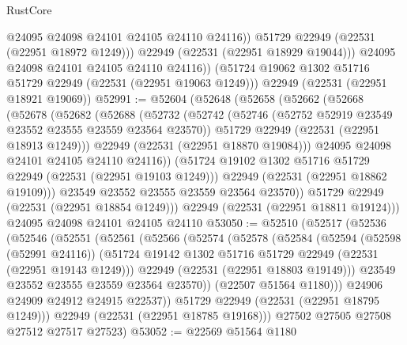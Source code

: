 \begin{lexlean}{RustCore}
\begin{coremodule}
                @24095
                @24098
                @24101
                @24105
                @24110
                @24116))
            @51729
            @22949
            (@22531 (@22951 @18972 @1249)))
          @22949
          (@22531 (@22951 @18929 @19044)))
        @24095
        @24098
        @24101
        @24105
        @24110
        @24116))
    (@51724 @19062 @1302 @51716 @51729 @22949 (@22531 (@22951 @19063 @1249)))
    @22949
    (@22531 (@22951 @18921 @19069))
@52991 := @52604
    (@52648
      (@52658
        (@52662
          (@52668
            (@52678
              (@52682
                (@52688
                  (@52732
                    (@52742
                      (@52746 (@52752 @52919 @23549 @23552 @23555 @23559 @23564 @23570))
                      @51729
                      @22949
                      (@22531 (@22951 @18913 @1249)))
                    @22949
                    (@22531 (@22951 @18870 @19084)))
                  @24095
                  @24098
                  @24101
                  @24105
                  @24110
                  @24116))
              (@51724 @19102 @1302 @51716 @51729 @22949 (@22531 (@22951 @19103 @1249)))
              @22949
              (@22531 (@22951 @18862 @19109)))
            @23549
            @23552
            @23555
            @23559
            @23564
            @23570))
        @51729
        @22949
        (@22531 (@22951 @18854 @1249)))
      @22949
      (@22531 (@22951 @18811 @19124)))
    @24095
    @24098
    @24101
    @24105
    @24110
@53050 := @52510
    (@52517
      (@52536
        (@52546
          (@52551
            (@52561
              (@52566
                (@52574
                  (@52578
                    (@52584
                      (@52594
                        (@52598 (@52991 @24116))
                        (@51724 @19142 @1302 @51716 @51729 @22949 (@22531 (@22951 @19143 @1249)))
                        @22949
                        (@22531 (@22951 @18803 @19149)))
                      @23549
                      @23552
                      @23555
                      @23559
                      @23564
                      @23570))
                  (@22507 @51564 @1180)))
              @24906
              @24909
              @24912
              @24915
              @22537))
          @51729
          @22949
          (@22531 (@22951 @18795 @1249)))
        @22949
        (@22531 (@22951 @18785 @19168)))
      @27502
      @27505
      @27508
      @27512
      @27517
      @27523)
@53052 := @22569 @51564 @1180

\end{coremodule}
\end{lexlean}
